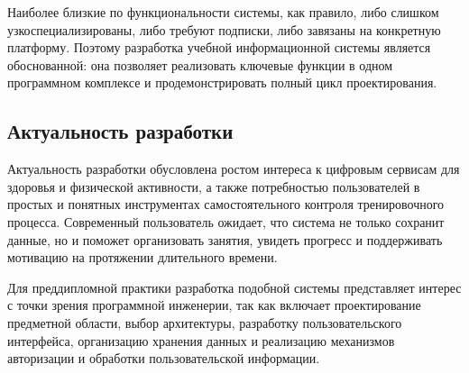 Наиболее близкие по функциональности системы, как правило, либо слишком узкоспециализированы, либо требуют подписки, либо завязаны на конкретную платформу. Поэтому разработка учебной информационной системы является обоснованной: она позволяет реализовать ключевые функции в одном программном комплексе и продемонстрировать полный цикл проектирования.

\subsection{Актуальность разработки}

Актуальность разработки обусловлена ростом интереса к цифровым сервисам для здоровья и физической активности, а также потребностью пользователей в простых и понятных инструментах самостоятельного контроля тренировочного процесса. Современный пользователь ожидает, что система не только сохранит данные, но и поможет организовать занятия, увидеть прогресс и поддерживать мотивацию на протяжении длительного времени.

Для преддипломной практики разработка подобной системы представляет интерес с точки зрения программной инженерии, так как включает проектирование предметной области, выбор архитектуры, разработку пользовательского интерфейса, организацию хранения данных и реализацию механизмов авторизации и обработки пользовательской информации.

